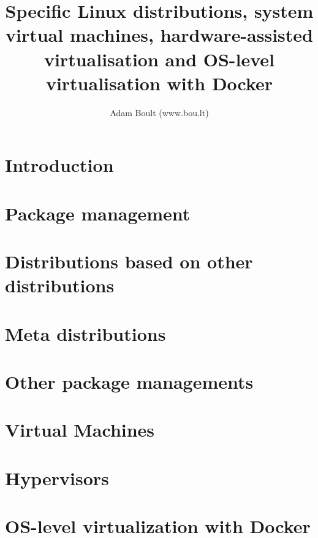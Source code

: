 \documentclass[oneside]{book}
\begin{document}
\author{Adam Boult (www.bou.lt)}
\title{Specific Linux distributions, system virtual machines, hardware-assisted virtualisation and OS-level virtualisation with Docker}
\maketitle

\setcounter{tocdepth}{0}
\tableofcontents



\part{Introduction}


\part{Package management}











\part{Distributions based on other distributions}


\part{Meta distributions}


\part{Other package managements}



\part{Virtual Machines}


\part{Hypervisors}

\part{OS-level virtualization with Docker}

\end{document}
